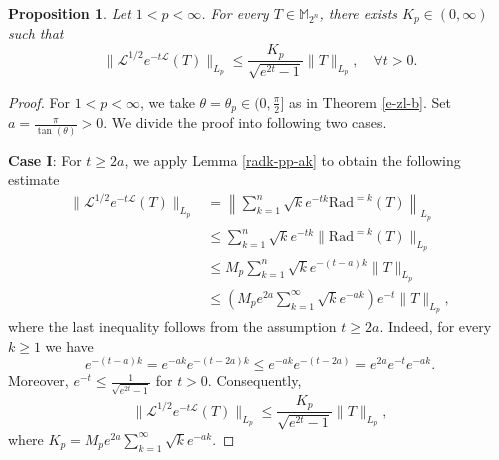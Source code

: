 \documentclass{amsbook}
\newtheorem{proposition}[theorem]{Proposition}
\theoremstyle{definition}
\theoremstyle{remark}
\numberwithin{section}{chapter}
\numberwithin{equation}{chapter}
\newcommand{\1}{\mathbf{1}}
\begin{document}
\begin{proposition}\label{d1-2-dtail-2}
Let $1<p<\infty$. For  every  $T\in \mathbb{M}_{2^n}$, there exists $K_p \in(0, \infty)$ such that
\[
\|\mathcal{L}^{1 / 2} e^{-t \mathcal{L}} (T)\|_{L_{p}} \leq \frac{K_p}{\sqrt{e^{2 t}-1}}\|T\|_{L_{p}},\quad \forall t>0.
\]
\end{proposition}
\begin{proof}
For $1<p<\infty$, we take $\theta=\theta_p\in (0,\frac{\pi}{2}]$ as in Theorem \ref{e-zl-b}.  Set $a=\frac{\pi}{\tan(\theta)}>0$. We divide the proof into following two cases.

\textbf{Case I}: For $t \geq 2 a$, we apply Lemma \ref{radk-pp-ak} to obtain the following estimate
\begin{align*}
\|\mathcal{L}^{1/2} e^{-t \mathcal{L}} (T)\|_{L_{p}} & =\left\|\sum_{k=1}^{n} \sqrt{k} e^{-t k}\mathrm{Rad}^{=k} (T)\right\|_{L_{p}} \\
&\leq \sum_{k=1}^{n} \sqrt{k} e^{-t k}\|\mathrm{Rad}^{=k} (T)\|_{L_{p}} \\
& \leq M_p \sum_{k=1}^{n} \sqrt{k} e^{-(t-a) k}\|T\|_{L_{p}}  \\
& \leq\left(M_p e^{2a} \sum_{k=1}^{\infty} \sqrt{k} e^{-a k}\right) e^{-t}\|T\|_{L_{p}},
\end{align*}
where the last inequality follows from the assumption $t\geq 2a$. Indeed, for every $k\geq1$ we have
\[
e^{-(t-a)k}
=e^{-ak}e^{-(t-2a)k}
\leq e^{-ak}e^{-(t-2a)}
=e^{2a}e^{-t}e^{-ak}.
\]
Moreover, $
e^{-t}\leq\frac{1}{\sqrt{e^{2t}-1}}$ for $ t>0.$ Consequently,
$$
\|\mathcal{L}^{1/2} e^{-t \mathcal{L}} (T)\|_{L_{p}}\leq \frac{K_p}{\sqrt{e^{2 t}-1}}\|T\|_{L_{p}},
$$
where $K_p=M_p e^{2a} \sum_{k=1}^{\infty} \sqrt{k} e^{-a k}$. 


\end{proof}
\end{document}
